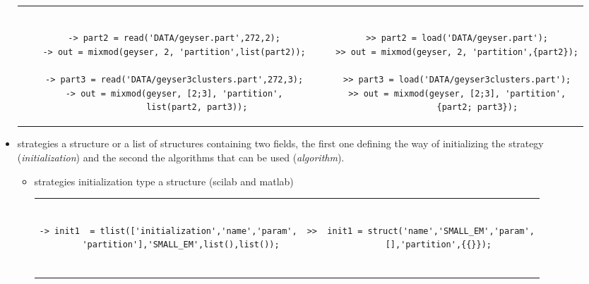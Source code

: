\begin{itemize}
\begin{tabular}{c|c}
\begin{minipage}[c]{0.52\columnwidth}%
{\scriptsize
\begin{verbatim}

    -> part2 = read('DATA/geyser.part',272,2);
    -> out = mixmod(geyser, 2, 'partition',list(part2));

    -> part3 = read('DATA/geyser3clusters.part',272,3);
    -> out = mixmod(geyser, [2;3], 'partition',
             list(part2, part3));
\end{verbatim}}
\end{minipage}
&
\begin{minipage}[c]{0.51\columnwidth}
{\scriptsize
\begin{verbatim}

    >> part2 = load('DATA/geyser.part');
    >> out = mixmod(geyser, 2, 'partition',{part2});

    >> part3 = load('DATA/geyser3clusters.part');
    >> out = mixmod(geyser, [2;3], 'partition',
            {part2; part3});
\end{verbatim}}
\end{minipage}
\end{tabular}



\item strategies a structure or a list of structures containing two fields, the first one
defining the way of initializing
the strategy ({\it initialization}) and the second the algorithms that can be used ({\it algorithm}).

\begin{itemize}
\item strategies initialization type a structure (scilab and matlab)


	\begin{tabular}{c|c}
	\begin{minipage}[c]{0.47\columnwidth}%
{\scriptsize
	\begin{verbatim}

-> init1  = tlist(['initialization','name','param',
     'partition'],'SMALL_EM',list(),list());

\end{verbatim}}
	\end{minipage}%
&
	\begin{minipage}[c]{0.58\columnwidth}%
{\scriptsize
	\begin{verbatim}

>>  init1 = struct('name','SMALL_EM','param',
       [],'partition',{{}});


\end{verbatim}}
\end{minipage}
\end{tabular}
\end{itemize}
\end{itemize}
